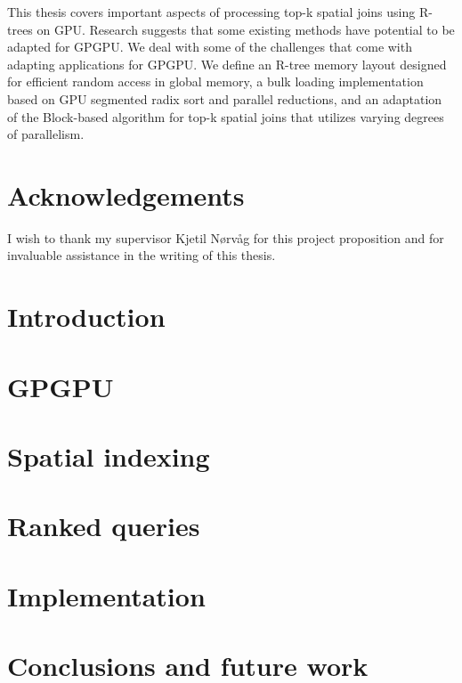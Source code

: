 \documentclass[12pt]{report}
\begin{document}
This thesis covers important aspects of processing top-k spatial joins using R-trees on GPU\@. Research suggests that some existing methods have potential to be adapted for GPGPU. We deal with some of the challenges that come with adapting applications for GPGPU. We define an R-tree memory layout designed for efficient random access in global memory, a bulk loading implementation based on GPU segmented radix sort and parallel reductions, and an adaptation of the Block-based algorithm for top-k spatial joins that utilizes varying degrees of parallelism.

\chapter*{Acknowledgements}
I wish to thank my supervisor Kjetil Nørvåg for this project proposition and for invaluable assistance in the writing of this thesis.

\tableofcontents

\chapter{Introduction}


\chapter{GPGPU}


\chapter{Spatial indexing}


\chapter{Ranked queries}


\chapter{Implementation}


\chapter{Conclusions and future work}


%

\printbibliography{}
\end{document}
